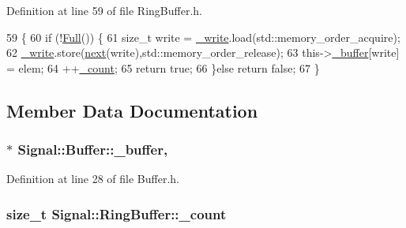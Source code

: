 Definition at line 59 of file Ring\+Buffer.\+h.


\begin{DoxyCode}
59                                                          \{
60         \textcolor{keywordflow}{if} (!\hyperlink{classSignal_1_1RingBuffer_ac8124016cfc0c833a3565c87d5f6f1e5}{Full}()) \{
61             \textcolor{keywordtype}{size\_t} write = \hyperlink{classSignal_1_1RingBuffer_a121cbb3679c61132fad237c671d08bef}{\_write}.load(std::memory\_order\_acquire);
62             \hyperlink{classSignal_1_1RingBuffer_a121cbb3679c61132fad237c671d08bef}{\_write}.store(\hyperlink{classSignal_1_1RingBuffer_a14a5990d51a45d131ee8aebd90bb87b9}{next}(write),std::memory\_order\_release);
63             this->\hyperlink{classSignal_1_1Buffer_ae88831d6fdf8fd7591d5dd7f79531d5f}{\_buffer}[write] = elem;
64             ++\hyperlink{classSignal_1_1RingBuffer_ab41dbb1bd8c572099349f92055ed9185}{\_count};
65             \textcolor{keywordflow}{return} \textcolor{keyword}{true};
66         \}\textcolor{keywordflow}{else} \textcolor{keywordflow}{return} \textcolor{keyword}{false};
67     \}
\end{DoxyCode}


\subsection{Member Data Documentation}
\hypertarget{classSignal_1_1Buffer_ae88831d6fdf8fd7591d5dd7f79531d5f}{
\subsubsection[{\+\_\+buffer}]{$\ast$ Signal\+::\+Buffer\+::\+\_\+buffer\hspace{0.3cm}{\ttfamily [protected]}, {\ttfamily [inherited]}}}\label{classSignal_1_1Buffer_ae88831d6fdf8fd7591d5dd7f79531d5f}


Definition at line 28 of file Buffer.\+h.

\hypertarget{classSignal_1_1RingBuffer_ab41dbb1bd8c572099349f92055ed9185}{
\subsubsection[{\+\_\+count}]{\setlength{\rightskip}{0pt plus 5cm}size\+\_\+t Signal\+::\+Ring\+Buffer\+::\+\_\+count\hspace{0.3cm}{\ttfamily [protected]}}}\label{classSignal_1_1RingBuffer_ab41dbb1bd8c572099349f92055ed9185}


